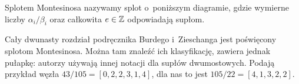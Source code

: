%
\begin{definition}
    Splotem Montesinosa nazywamy splot o~poniższym diagramie, gdzie wymierne liczby $\alpha_i/\beta_i$ oraz całkowita $e \in \mathbb Z$ odpowiadają supłom.

\end{definition}

Cały dwunasty rozdział podręcznika Burdego i~Zieschanga \cite{burde2014} jest poświęcony splotom Montesinosa.
Można tam znaleźć ich klasyfikację, zawiera jednak pułapkę: autorzy używają innej notacji dla supłów dwumostowych.
Podają przykład węzła $43/105 = [0, 2, 2, 3, 1, 4]$, dla nas to jest $105/22 = [4, 1, 3, 2, 2]$.


